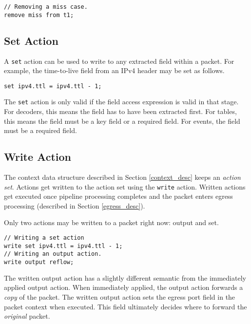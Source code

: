 \begin{codepage}
\begin{lstlisting}
// Removing a miss case.
remove miss from t1;
\end{lstlisting}
\end{codepage}

\subsection{Set Action} \label{tut:set_action}

A \texttt{set} action can be used to write to any extracted field within a
packet. For example, the time-to-live field from an IPv4 header may be set as
follows.

\begin{codepage}
\begin{lstlisting}
set ipv4.ttl = ipv4.ttl - 1;
\end{lstlisting}
\end{codepage}

The \texttt{set} action is only valid if the field access expression is valid in
that stage. For decoders, this means the field has to have been extracted first.
For tables, this means the field must be a key field or a required field. For
events, the field must be a required field.

\subsection{Write Action} \label{tut:write_action}

The context data structure described in Section \ref{context_desc} keeps an
\textit{action set}. Actions get written to the action set using the
\texttt{write} action. Written actions get executed once pipeline processing
completes and the packet enters egress processing (described in Section \ref{egress_desc}).

Only two actions may be written to a packet right now: output and set.

\begin{lstlisting}
// Writing a set action
write set ipv4.ttl = ipv4.ttl - 1;
// Writing an output action.
write output reflow;
\end{lstlisting}

The written output action has a slightly different semantic from the immediately
applied output action. When immediately applied, the output action forwards a
\textit{copy} of the packet. The written output action sets the egress port field
in the packet context when executed. This field ultimately decides where to forward the
\textit{original} packet.


